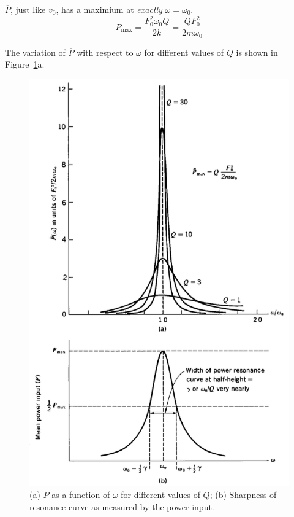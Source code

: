 $\overline{P}$, just like $v_0$, has a maximium at \emph{exactly} $\omega = \omega_0$. 
\[ P_\text{max} = \frac{F_0^2\omega_0 Q}{2k} = \frac{QF_0^2}{2m\omega_0}\]

The variation of $\overline{P}$ with respect to $\omega$ for different values of $Q$ is shown in Figure~\ref{ch4:fig-P-w-vs-Q}a.

\begin{fullwidth}
	\begin{figure}
		\centering
		\includegraphics[scale=0.65]{phys232/Ch4-P-w-vs-Q.png} \caption{(a) $\overline{P}$ as a function of $\omega$ for different values of $Q$; (b) Sharpness of resonance curve as measured by the power input.}	\label{ch4:fig-P-w-vs-Q}
	\end{figure}
\end{fullwidth}